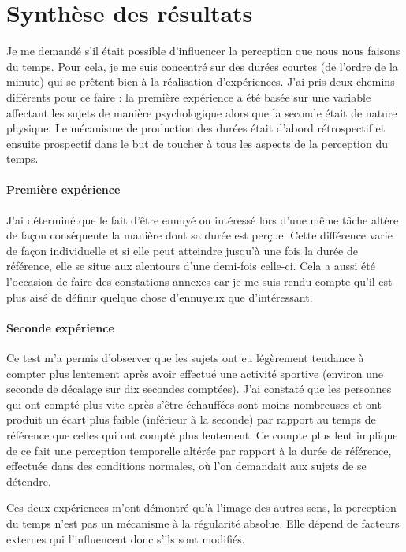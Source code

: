 \documentclass[12pt,fleqn,oneside,french,openany]{book} %
\begin{document}
\newpage
\section{Synthèse des résultats} \label{sec:synthres}
Je me demandé s'il était possible d'influencer la perception que nous nous faisons du temps. Pour cela, je me suis concentré sur des durées courtes (de l'ordre de la minute) qui se prêtent bien à la réalisation d'expériences. J'ai pris deux chemins différents pour ce faire : la première expérience a été basée sur une variable affectant les sujets de manière psychologique alors que la seconde était de nature physique. Le mécanisme de production des durées était d'abord rétrospectif et ensuite prospectif dans le but de toucher à tous les aspects de la perception du temps.

\paragraph{Première expérience}
J'ai déterminé que le fait d'être ennuyé ou intéressé lors d'une même tâche altère de façon conséquente la manière dont sa durée est perçue. Cette différence varie de façon individuelle et si elle peut atteindre jusqu'à une fois la durée de référence, elle se situe aux alentours d'une demi-fois celle-ci. Cela a aussi été l'occasion de faire des constations annexes car je me suis rendu compte qu'il est plus aisé de définir quelque chose d'ennuyeux que d'intéressant.

\paragraph{Seconde expérience}
Ce test m'a permis d'observer que les sujets ont eu légèrement tendance à compter plus lentement après avoir effectué une activité sportive (environ une seconde de décalage sur dix secondes comptées). J'ai constaté que les personnes qui ont compté plus vite après s'être échauffées sont moins nombreuses et ont produit un écart plus faible (inférieur à la seconde) par rapport au temps de référence que celles qui ont compté plus lentement. Ce compte plus lent implique de ce fait une perception temporelle altérée par rapport à la durée de référence, effectuée dans des conditions normales, où l'on demandait aux sujets de se détendre.

Ces deux expériences m'ont démontré qu'à l'image des autres sens, la perception du temps n'est pas un mécanisme à la régularité absolue. Elle dépend de facteurs externes qui l'influencent donc s'ils sont modifiés. 
\end{document}
